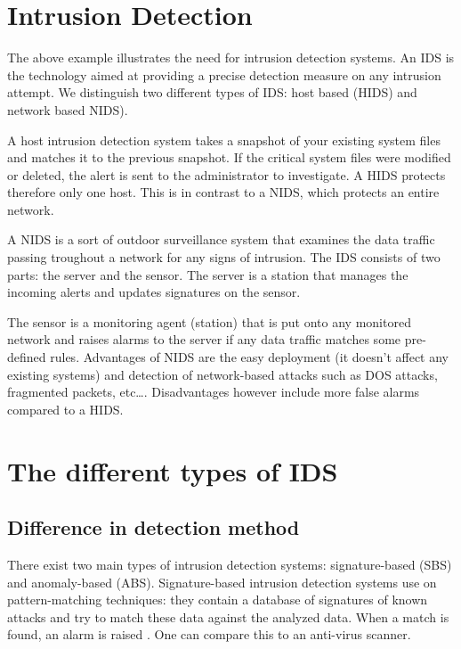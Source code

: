 \section{Intrusion Detection}

The \label{sec:ID} above example illustrates the need for intrusion detection systems. An IDS is the technology aimed at providing a precise detection measure on any intrusion attempt. We distinguish two different types of IDS: host based (HIDS) and network based NIDS).

A host intrusion detection system takes a snapshot of your existing system files and matches it to the previous snapshot. If the critical system files were modified or deleted, the alert is sent to the administrator to investigate. A HIDS protects therefore only one host. This is in contrast to a NIDS, which protects an entire network.

A NIDS is a sort of outdoor surveillance system that examines the data traffic passing troughout a network for any signs of intrusion. The IDS consists of two parts: the server and the sensor. The server is a station that manages the incoming alerts and updates signatures on the sensor. 

The sensor is a monitoring agent (station) that is put onto any monitored network and raises alarms to the server if any data traffic matches some pre-defined rules. Advantages of NIDS are the easy deployment (it doesn't affect any existing systems) and detection of network-based attacks such as DOS attacks, fragmented packets, etc\ldots. Disadvantages however include more false alarms compared to a HIDS.


\section{The different types of IDS}

\subsection{Difference in detection method}

There exist two main types of intrusion detection systems: signature-based (SBS) and anomaly-based (ABS). Signature-based intrusion detection systems use on pattern-matching techniques: they contain a database of signatures of known attacks and try to match these data against the analyzed data. When a match is found, an alarm is raised \citep{Roberto}. One can compare this to an anti-virus scanner.

